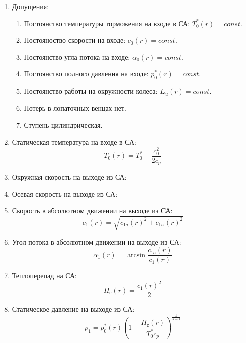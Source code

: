 \documentclass[a4paper,10pt]{article}
\begin{document}
    \begin{enumerate}

        \item Допущения:

        \begin{enumerate}

            \item Постоянство температуры торможения на входе в СА: $T_0^*(r) = const$.
            \item Постояноство скорости на входе: $c_0(r) = const$.
            \item Постоянство угла потока на входе: $\alpha_0(r) = const$.
            \item Постоянство полного давления на входе: $p_0^*(r) = const$.
            \item Постоянство работы на окружности колеса: $L_u(r) = const$.
            \item Потерь в лопаточных венцах нет.
            \item Ступень цилиндрическая.

        \end{enumerate}

%        

        \item Статическая температура на входе в СА:
        \[
            T_0(r) = T_0^* - \frac{c_0 ^ 2}{2 c_p}
        \]

        \item Окружная скорость на выходе из СА:
%        

        \item Осевая скорость на выходе из СА:
%        

        \item Скорость в абсолютном движении на выходе из СА:
        \[
            c_1(r) = \sqrt{c_{1a}(r)^2 + c_{1u}(r)^2}
        \]

        \item Угол потока в абсолютном движении на выходе из СА:
        \[
            \alpha_1 (r) = \arcsin{\frac{c_{1a}(r)}{c_1(r)}}
        \]

        \item Теплоперепад на СА:
        \[
            H_с (r) = \frac{c_1(r) ^ 2}{2}
        \]

        \item Статическое давление на выходе из СА:
        \[
            p_1 = p_0^*(r) \left( 1 - \frac{H_с (r)}{T_0^* c_p} \right) ^ {\frac{k}{k - 1}}
        \]


\end{enumerate}
\end{document}
